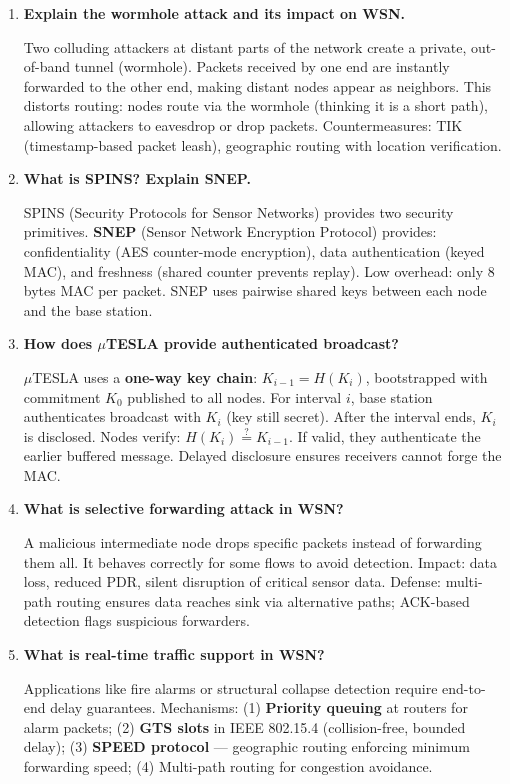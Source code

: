 \documentclass[12pt,a4paper]{article}
\newcommand{\Q}[1]{\textbf{#1}\par\noindent\ignorespaces}
\begin{document}
\begin{tcolorbox}[exambox, title={\textbf{Frequently Asked / Viva Questions}}]
\begin{enumerate}[topsep=0pt, label=\textbf{Q\arabic*.}, itemsep=5pt]
  \item \Q{Explain the wormhole attack and its impact on WSN.}
  Two colluding attackers at distant parts of the network create a private, out-of-band tunnel (wormhole). Packets received by one end are instantly forwarded to the other end, making distant nodes appear as neighbors. This distorts routing: nodes route via the wormhole (thinking it is a short path), allowing attackers to eavesdrop or drop packets. Countermeasures: TIK (timestamp-based packet leash), geographic routing with location verification.

  \item \Q{What is SPINS? Explain SNEP.}
  SPINS (Security Protocols for Sensor Networks) provides two security primitives. \textbf{SNEP} (Sensor Network Encryption Protocol) provides: confidentiality (AES counter-mode encryption), data authentication (keyed MAC), and freshness (shared counter prevents replay). Low overhead: only 8 bytes MAC per packet. SNEP uses pairwise shared keys between each node and the base station.

  \item \Q{How does $\mu$TESLA provide authenticated broadcast?}
  $\mu$TESLA uses a \textbf{one-way key chain}: $K_{i-1} = H(K_i)$, bootstrapped with commitment $K_0$ published to all nodes. For interval $i$, base station authenticates broadcast with $K_i$ (key still secret). After the interval ends, $K_i$ is disclosed. Nodes verify: $H(K_i) \stackrel{?}{=} K_{i-1}$. If valid, they authenticate the earlier buffered message. Delayed disclosure ensures receivers cannot forge the MAC.

  \item \Q{What is selective forwarding attack in WSN?}
  A malicious intermediate node drops specific packets instead of forwarding them all. It behaves correctly for some flows to avoid detection. Impact: data loss, reduced PDR, silent disruption of critical sensor data. Defense: multi-path routing ensures data reaches sink via alternative paths; ACK-based detection flags suspicious forwarders.

  \item \Q{What is real-time traffic support in WSN?}
  Applications like fire alarms or structural collapse detection require end-to-end delay guarantees. Mechanisms: (1) \textbf{Priority queuing} at routers for alarm packets; (2) \textbf{GTS slots} in IEEE 802.15.4 (collision-free, bounded delay); (3) \textbf{SPEED protocol} --- geographic routing enforcing minimum forwarding speed; (4) Multi-path routing for congestion avoidance.


\end{enumerate}
\end{tcolorbox}
\end{document}
